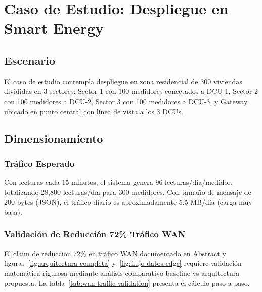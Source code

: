 ﻿\section{Caso de Estudio: Despliegue en Smart Energy}

\subsection{Escenario}

El caso de estudio contempla despliegue en zona residencial de 300 viviendas divididas en 3 sectores: Sector 1 con 100 medidores conectados a DCU-1, Sector 2 con 100 medidores a DCU-2, Sector 3 con 100 medidores a DCU-3, y Gateway ubicado en punto central con línea de vista a los 3 DCUs.

\subsection{Dimensionamiento}

\subsubsection{Tráfico Esperado}

Con lecturas cada 15 minutos, el sistema genera 96 lecturas/día/medidor, totalizando 28,800 lecturas/día para 300 medidores. Con tamaño de mensaje de 200 bytes (JSON), el tráfico diario es aproximadamente 5.5 MB/día (carga muy baja).

\subsubsection{Validación de Reducción 72\% Tráfico WAN}

El claim de reducción 72\% en tráfico WAN documentado en Abstract y figuras~\ref{fig:arquitectura-completa} y~\ref{fig:flujo-datos-edge} requiere validación matemática rigurosa mediante análisis comparativo baseline vs arquitectura propuesta. La tabla~\ref{tab:wan-traffic-validation} presenta el cálculo paso a paso.

